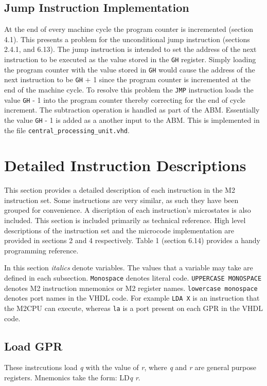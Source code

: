 \documentclass[a4paper,12pt]{article}
\newcommand{\mt}{M2CPU}
\newcommand{\mi}{M2 instruction set}
\newcommand{\Gr}{\texttt{G}}
\newcommand{\Hr}{\texttt{H}}
\newcommand{\qq}{\textit{q}}
\newcommand\rr{\textit{r}}
\begin{document}
\subsection{Jump Instruction Implementation}
At the end of every machine cycle the program counter is incremented (section 
4.1). This presents a problem for the unconditional jump instruction (sections 
2.4.1, and 6.13). The jump instruction is intended to set the address of the 
next instruction to be executed as the value stored in the \Gr{}\Hr{} register.
Simply loading the program counter with the value stored in \Gr{}\Hr{} would 
cause the address of the next instruction to be \Gr{}\Hr{} + 1 since the program
counter is incremented at the end of the machine cycle. To resolve this problem
the \texttt{JMP} instruction loads the value \Gr{}\Hr{} - 1 into the program
counter thereby correcting for the end of cycle increment. The subtraction 
operation is handled as part of the ABM. Essentially the value \Gr{}\Hr{} - 1
is added as a another input to the ABM. This is implemented in the file
\texttt{central\_processing\_unit.vhd}.
\par

\newpage
\section{Detailed Instruction Descriptions}
This section provides a detailed description of each instruction in the \mi{}.
Some instructions are very similar, as such they have been grouped for 
convenience. A discription of each instruction's microstates is also included.
This section is included primarily as technical reference. High level 
descriptions of the instruction set and the microcode implementation are provided
in sections 2 and 4 respectively. Table 1 (section 6.14) provides a handy 
programming reference.
\par

In this section \textit{italics} denote variables. The values that a variable 
may take are defined in each subsection. \texttt{Monospace} denotes literal 
code. \texttt{UPPERCASE MONOSPACE} denotes M2 instruction mnemonics or M2 
register names. \texttt{lowercase monospace} denotes port names in the VHDL
code. For example \texttt{LDA X} is an instruction that the \mt{} can execute,
whereas \texttt{la} is a port present on each GPR in the VHDL code.
\par

\subsection{Load GPR}
These instrcutions load \qq{} with the value of \rr{}, where \qq{} and \rr{}
are general purpose registers. Mnemonics take the form: LD\qq{} \rr{}.
\par
\end{document}

